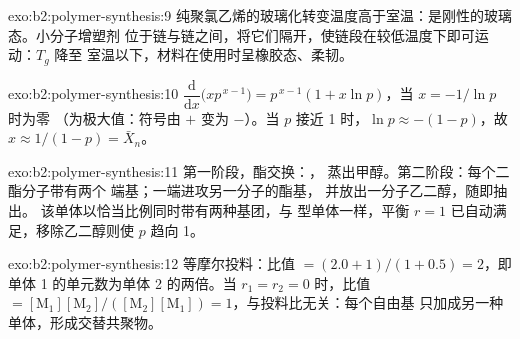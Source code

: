 \begin{solution}{exo:b2:polymer-synthesis:9}
纯聚氯乙烯的玻璃化转变温度高于室温：是刚性的玻璃态。小分子增塑剂
位于链与链之间，将它们隔开，使链段在较低温度下即可运动：$T_g$ 降至
室温以下，材料在使用时呈橡胶态、柔韧。
\end{solution}

\begin{solution}{exo:b2:polymer-synthesis:10}
$\dfrac{\mathrm d}{\mathrm dx}\bigl(x p^{\,x-1}\bigr) = p^{\,x-1}(1 + x\ln p)$，当 $x = -1/\ln p$ 时为零
（为极大值：符号由 $+$ 变为 $-$）。当 $p$ 接近 1 时，$\ln p \approx -(1-p)$，故 $x \approx
1/(1-p) = \bar X_n$。
\end{solution}

\begin{solution}{exo:b2:polymer-synthesis:11}
第一阶段，酯交换：，
蒸出甲醇。第二阶段：每个二酯分子带有两个  端基；一端进攻另一分子的酯基，
并放出一分子乙二醇，随即抽出。
该单体以恰当比例同时带有两种基团，与  型单体一样，平衡
$r = 1$ 已自动满足，移除乙二醇则使 $p$ 趋向 1。
\end{solution}

\begin{solution}{exo:b2:polymer-synthesis:12}
等摩尔投料：比值 $= (2.0 + 1)/(1 + 0.5) = 2$，即单体 1 的单元数为单体 2 的两倍。当 $r_1 = r_2 =
0$ 时，比值 $= [\mathrm M_1][\mathrm M_2]/([\mathrm M_2][\mathrm M_1]) = 1$，与投料比无关：每个自由基
只加成另一种单体，形成交替共聚物。
\end{solution}

